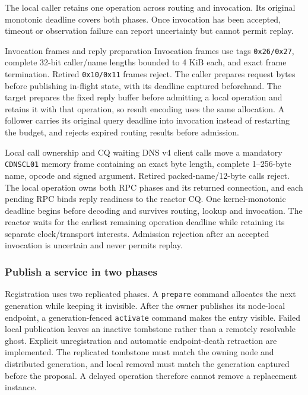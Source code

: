 The local caller retains one operation across routing and invocation. Its
original monotonic deadline covers both phases. Once invocation has been
accepted, timeout or observation failure can report uncertainty but cannot
permit replay.

\begin{implementationdetail}{Invocation frames and reply preparation}
Invocation frames use tags \texttt{0x26/0x27}, complete 32-bit caller/name
lengths bounded to 4 KiB each, and exact frame termination. Retired
\texttt{0x10/0x11} frames reject. The caller prepares request bytes before
publishing in-flight state, with its deadline captured beforehand. The target
prepares the fixed reply buffer before admitting a local operation and retains
it with that operation, so result encoding uses the same allocation. A follower
carries its original query deadline into invocation instead of restarting the
budget, and rejects expired routing results before admission.
\end{implementationdetail}

\begin{implementationdetail}{Local call ownership and CQ waiting}
DNS v4 client calls move a mandatory \texttt{CDNSCL01} memory frame containing
an exact byte length, complete 1--256-byte name, opcode and signed argument.
Retired packed-name/12-byte calls reject. The local operation owns both RPC
phases and its returned connection, and each pending RPC binds reply readiness to
the reactor CQ. One kernel-monotonic deadline begins before decoding and survives
routing, lookup and invocation. The reactor waits for the earliest remaining
operation deadline while retaining its separate clock/transport interests.
Admission rejection after an accepted invocation is uncertain and never permits
replay.
\end{implementationdetail}

\subsubsection{Publish a service in two phases}

Registration uses two replicated phases. A \texttt{prepare} command allocates
the next generation while keeping it invisible. After the owner publishes its
node-local endpoint, a generation-fenced \texttt{activate} command makes the
entry visible. Failed local publication leaves an inactive tombstone rather
than a remotely resolvable ghost. Explicit unregistration and automatic
endpoint-death retraction are implemented. The
replicated tombstone must match the owning node and distributed generation, and
local removal must match the generation captured before the proposal. A delayed
operation therefore cannot remove a replacement instance.

